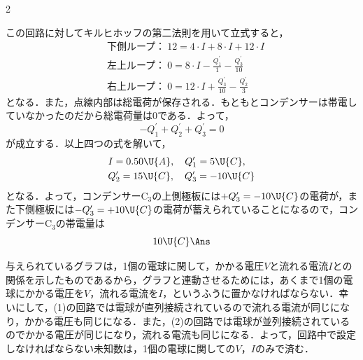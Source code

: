 \begin{multicols}{2}
\begin{komon}
       この回路に対してキルヒホッフの第二法則を用いて立式すると，
       \[\begin{aligned}
         &\text{下側ループ：}\ 12=4\cdot I+8\cdot I+12\cdot I\\
         &\text{左上ループ：}\ 0=8\cdot I-\frac{Q_1^\prime}{1}-\frac{Q_3^\prime}{10}\\
         &\text{右上ループ：}\ 0=12\cdot I+\frac{Q_3^\prime}{10}-\frac{Q_2^\prime}{3}
       \end{aligned}\]
       となる．また，点線内部は総電荷が保存される．もともとコンデンサーは帯電していなかったのだから総電荷量は$0$である．よって，
       \[-Q_1^\prime+Q_2^\prime+Q_3^\prime=0\]
       が成立する．以上四つの式を解いて，
       \[\begin{aligned}&I=0.50\U{A},\quad Q_1^\prime=5\U{C},\\ &Q_2^\prime=15\U{C},\quad Q_3^\prime=-10\U{C}\end{aligned}\]
       となる．よって，コンデンサー$\mathrm{C}_3$の上側極板には$+Q_3^\prime=-10\U{C}$の電荷が，また下側極板には$-Q_3^\prime=+10\U{C}$の電荷が蓄えられていることになるので，コンデンサー$\mathrm{C}_3$の帯電量は
       \[10\U{C}\Ans\]
\end{komon}

\par\nopagebreak
\begin{sisin}
与えられているグラフは，1個の電球に関して，かかる電圧$V$と流れる電流$I$との関係を示したものであるから，グラフと連動させるためには，あくまで1個の電球にかかる電圧を$V$，流れる電流を$I$，というふうに置かなければならない．幸いにして，(1)の回路では電球が直列接続されているので流れる電流が同じになり，かかる電圧も同じになる．また，(2)の回路では電球が並列接続されているのでかかる電圧が同じになり，流れる電流も同じになる．よって，回路中で設定しなければならない未知数は，1個の電球に関しての$V$，$I$のみで済む．


\end{sisin}
\end{multicols}
